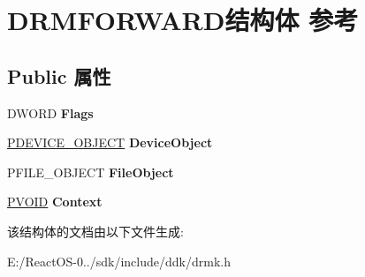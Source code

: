 \hypertarget{struct_d_r_m_f_o_r_w_a_r_d}{}\section{D\+R\+M\+F\+O\+R\+W\+A\+R\+D结构体 参考}
\label{struct_d_r_m_f_o_r_w_a_r_d}
\subsection*{Public 属性}
\begin{DoxyCompactItemize}
\item 
\mbox{\label{struct_d_r_m_f_o_r_w_a_r_d_a2516ff33f7055b3984824c8956ab87bc}} 
D\+W\+O\+RD {\bfseries Flags}
\item 
\mbox{\label{struct_d_r_m_f_o_r_w_a_r_d_a3b891deae9293ee86ae2dc5da2ed2333}} 
\hyperlink{struct___d_e_v_i_c_e___o_b_j_e_c_t}{P\+D\+E\+V\+I\+C\+E\+\_\+\+O\+B\+J\+E\+CT} {\bfseries Device\+Object}
\item 
\mbox{\label{struct_d_r_m_f_o_r_w_a_r_d_ad305317114fdf4d01492de7e37c99659}} 
P\+F\+I\+L\+E\+\_\+\+O\+B\+J\+E\+CT {\bfseries File\+Object}
\item 
\mbox{\label{struct_d_r_m_f_o_r_w_a_r_d_afd78e746a3c07ce80eeff222c40d2efd}} 
\hyperlink{interfacevoid}{P\+V\+O\+ID} {\bfseries Context}
\end{DoxyCompactItemize}


该结构体的文档由以下文件生成\+:\begin{DoxyCompactItemize}
\item 
E\+:/\+React\+O\+S-\/0../sdk/include/ddk/drmk.\+h\end{DoxyCompactItemize}
